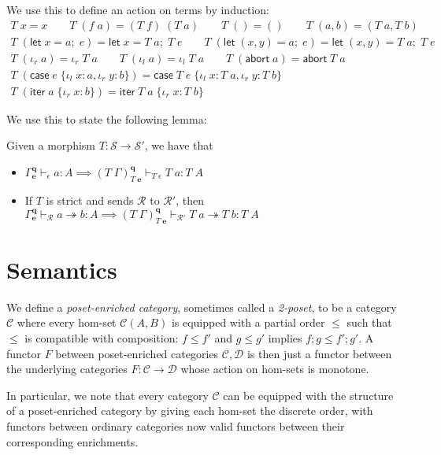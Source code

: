 \documentclass[acmsmall,screen,review]{acmart}
\newcommand{\mc}[1]{\ensuremath{\mathcal{#1}}}
\newcommand{\mb}[1]{\ensuremath{\mathbf{#1}}}
\newcommand{\ms}[1]{\ensuremath{\mathsf{#1}}}
\newcommand{\lto}{:}
\newcommand{\linl}[1]{\iota_l\;{#1}}
\newcommand{\linr}[1]{\iota_r\;{#1}}
\newcommand{\labort}[1]{\ms{abort}\;{#1}}
\newcommand{\letexpr}[3]{\ensuremath{\ms{let}\;#1 = #2;\;#3}}
\newcommand{\caseexpr}[5]{\ms{case}\;#1\;\{\linl{#2} \lto #3, \linr{#4} \lto #5\}}
\newcommand{\liter}[3]{\ms{iter}\;#1\;\{ \linr{#2} \lto #3 \}}
\newcommand{\hasty}[4]{#1 \vdash_{#2} #3: {#4}}
\newcommand{\tref}{\twoheadrightarrow}
\newcommand{\tmle}[5]{#1 \vdash_{#2} #3 \tref #4 : {#5}}
\begin{document}
We use this to define an action on terms by induction:
\begin{gather*}
  T\;x = x \qquad T\;(f\;a) = (T\;f)\;(T\;a) \qquad T\;() = () \qquad T\;(a, b) = (T\;a, T\;b) \\
  T\;(\letexpr{x}{a}{e}) = \letexpr{x}{T\;a}{T\;e} \qquad
  T\;(\letexpr{(x, y)}{a}{e}) = \letexpr{(x, y)}{T\;a}{T\;e} \\
  T\;(\linr{a}) = \linr{T\;a} \qquad T\;(\linl{a}) = \linl{T\;a} \qquad
  T\;(\labort{a}) = \labort{T\;a} \\
  T\;(\caseexpr{e}{x}{a}{y}{b}) = \caseexpr{T\;e}{x}{T\;a}{y}{T\;b} \\
  T\;(\liter{a}{x}{b}) = \liter{T\;a}{x}{T\;b}
\end{gather*}

We use this to state the following lemma:
\begin{lemma}
  Given a morphism $T: \mc{S} \to \mc{S}'$, we have that
  \begin{itemize}
    \item $\hasty{\Gamma^{\mb{q}}_{\mb{e}}}{\epsilon}{a}{A} 
      \implies \hasty{(T\;\Gamma)^{\mb{q}}_{T\;\mb{e}}}{T\;\epsilon}{T\;a}{T\;A}$
    \item If $T$ is strict and sends $\mc{R}$ to $\mc{R}'$, then
    $\tmle{\Gamma^{\mb{q}}_{\mb{e}}}{\mc{R}}{a}{b}{A}
      \implies \tmle{(T\;\Gamma)^{\mb{q}}_{T\;\mb{e}}}{\mc{R}'}{T\;a}{T\;b}{T\;A}$
  \end{itemize}
\end{lemma}

\section{Semantics}

\begin{definition}
  We define a \emph{poset-enriched category}, sometimes called a \emph{2-poset}, to be a category
  $\mc{C}$ where every hom-set $\mc{C}(A, B)$ is equipped with a partial order $\leq$ such that
  $\leq$ is compatible with composition: $f \leq f'$ and $g \leq g'$ implies $f;g \leq f';g'$. A
  functor $F$ between poset-enriched categories $\mc{C}, \mc{D}$ is then just a functor between the
  underlying categories $F : \mc{C} \to \mc{D}$ whose action on hom-sets is monotone.

  In particular, we note that every category $\mc{C}$ can be equipped with the structure of a
  poset-enriched category by giving each hom-set the discrete order, with functors between ordinary
  categories now valid functors between their corresponding enrichments.
\end{definition}
\end{document}
